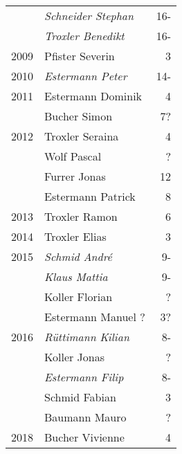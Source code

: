 {\begin{longtable}{ l l r }
                      & \emph{Schneider Stephan}                  & 16-         \\
                      & \emph{Troxler Benedikt}                   & 16-         \\
        2009          & Pfister Severin                           & 3           \\
        2010          & \emph{Estermann Peter}                    & 14-         \\
        2011          & Estermann Dominik                         & 4           \\
                      & Bucher Simon                              & 7?          \\
        2012          & Troxler Seraina                           & 4           \\
                      & Wolf Pascal                               & ?           \\
                      & Furrer Jonas                              & 12          \\
                      & Estermann Patrick                         & 8           \\
        2013          & Troxler Ramon                             & 6           \\
        2014          & Troxler Elias                             & 3           \\
        2015          & \emph{Schmid André}                       & 9-          \\
                      & \emph{Klaus Mattia}                       & 9-          \\
                      & Koller Florian                            & ?           \\
                      & Estermann Manuel ?                        & 3?          \\
        2016          & \emph{Rüttimann Kilian}                   & 8-          \\
                      & Koller Jonas                              & ?           \\
                      & \emph{Estermann Filip}                    & 8-          \\
                      & Schmid Fabian                             & 3           \\
                      & Baumann Mauro                             & ?           \\
        2018          & Bucher Vivienne                           & 4           \\

\end{longtable}}
